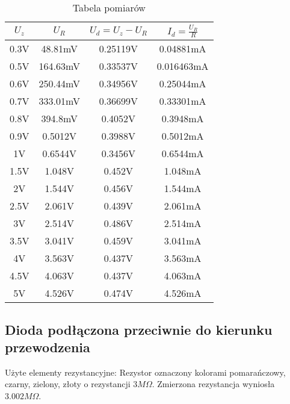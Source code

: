 \documentclass[polish,a4paper]{article}
\begin{document}
\begin{table}[H]
\centering
\begin{tabular}{|c|c||c|c|}
\hline
$U_{z}$ & $U_{R}$ & $U_{d}=U_{z}-U_{R}$ & $I_{d}=\frac{U_{R}}{R}$\\
\hline 
0.3V & 48.81mV & 0.25119V & 0.04881mA\\
\hline
0.5V & 164.63mV& 0.33537V & 0.016463mA\\
\hline
0.6V & 250.44mV & 0.34956V & 0.25044mA\\
\hline
0.7V & 333.01mV & 0.36699V & 0.33301mA\\
\hline
0.8V & 394.8mV & 0.4052V & 0.3948mA\\
\hline
0.9V & 0.5012V & 0.3988V & 0.5012mA\\
\hline
1V & 0.6544V & 0.3456V & 0.6544mA\\
\hline
1.5V & 1.048V & 0.452V & 1.048mA\\
\hline
2V & 1.544V & 0.456V & 1.544mA\\
\hline
2.5V & 2.061V & 0.439V & 2.061mA \\
\hline
3V & 2.514V & 0.486V & 2.514mA\\
\hline
3.5V & 3.041V & 0.459V & 3.041mA\\
\hline
4V & 3.563V & 0.437V & 3.563mA\\
\hline
4.5V & 4.063V & 0.437V & 4.063mA\\
\hline
5V & 4.526V & 0.474V & 4.526mA\\
\hline
\end{tabular}
\caption{Tabela pomiarów}
\end{table}

\subsection{Dioda podłączona przeciwnie do kierunku przewodzenia}
Użyte elementy rezystancyjne:
Rezystor oznaczony kolorami pomarańczowy, czarny, zielony, złoty o rezystancji $3M\Omega$. Zmierzona rezystancja wyniosła $3.002M\Omega$.
\end{document}
